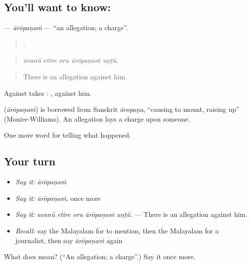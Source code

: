 \subsection*{You'll want to know: }
\textbf{} — \emph{ārōpaṇaṁ} — \textquotedblleft{}an allegation; a charge\textquotedblright{}.

\begin{quote}
    .
\end{quote}

\begin{quote}
\emph{avanŭ etire oru ārōpaṇaṁ uṇṭŭ.}
\end{quote}

\begin{quote}
There is an allegation against him.
\end{quote}

Against takes :  , against him.

\begin{cousinweb}
\textbf{} (\emph{ārōpaṇaṁ}) is borrowed from Sanskrit \emph{āropaṇa}, \textquotedblleft{}causing to mount, raising up\textquotedblright{} (Monier-Williams). An allegation lays a charge upon someone.
\end{cousinweb}

\begin{grammarlens}[title={What you've built}]
One more word for telling what happened.
\end{grammarlens}

\subsection*{Your turn}
\begin{itemize}
\raggedright
  \item \emph{Say it:} \emph{ārōpaṇaṁ}
  \item \emph{Say it:} \emph{ārōpaṇaṁ}, once more
  \item \emph{Say it:} \emph{avanŭ etire oru ārōpaṇaṁ uṇṭŭ.} — There is an allegation against him.
  \item \emph{Recall:} say the Malayalam for to mention, then the Malayalam for a journalist, then say \emph{ārōpaṇaṁ} again
\end{itemize}

\begin{tcolorbox}[breakable,colback=teal!4,colframe=teal!35!black,title={Before you move on}]
What does  mean? (\textquotedblleft{}An allegation; a charge\textquotedblright{}.) Say it once more.
\end{tcolorbox}
